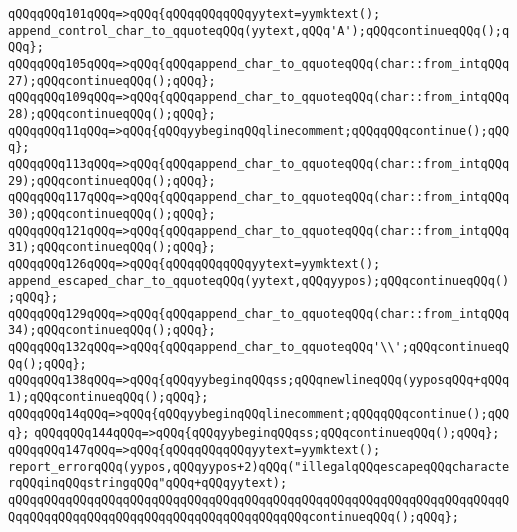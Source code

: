 \newline
\verb|qQQqqQQq101qQQq=>qQQq{qQQqqQQqqQQqyytext=yymktext();|\newline
\verb|append_control_char_to_qquoteqQQq(yytext,qQQq'A');qQQqcontinueqQQq();qQQq};|\newline
\verb|qQQqqQQq105qQQq=>qQQq{qQQqappend_char_to_qquoteqQQq(char::from_intqQQq27);qQQqcontinueqQQq();qQQq};|\newline
\verb|qQQqqQQq109qQQq=>qQQq{qQQqappend_char_to_qquoteqQQq(char::from_intqQQq28);qQQqcontinueqQQq();qQQq};|\newline
\verb|qQQqqQQq11qQQq=>qQQq{qQQqyybeginqQQqlinecomment;qQQqqQQqcontinue();qQQq};|\newline
\verb|qQQqqQQq113qQQq=>qQQq{qQQqappend_char_to_qquoteqQQq(char::from_intqQQq29);qQQqcontinueqQQq();qQQq};|\newline
\verb|qQQqqQQq117qQQq=>qQQq{qQQqappend_char_to_qquoteqQQq(char::from_intqQQq30);qQQqcontinueqQQq();qQQq};|\newline
\verb|qQQqqQQq121qQQq=>qQQq{qQQqappend_char_to_qquoteqQQq(char::from_intqQQq31);qQQqcontinueqQQq();qQQq};|\newline
\verb|qQQqqQQq126qQQq=>qQQq{qQQqqQQqqQQqyytext=yymktext();|\newline
\verb|append_escaped_char_to_qquoteqQQq(yytext,qQQqyypos);qQQqcontinueqQQq();qQQq};|\newline
\verb|qQQqqQQq129qQQq=>qQQq{qQQqappend_char_to_qquoteqQQq(char::from_intqQQq34);qQQqcontinueqQQq();qQQq};|\newline
\verb|qQQqqQQq132qQQq=>qQQq{qQQqappend_char_to_qquoteqQQq'\\';qQQqcontinueqQQq();qQQq};|\newline
\verb|qQQqqQQq138qQQq=>qQQq{qQQqyybeginqQQqss;qQQqnewlineqQQq(yyposqQQq+qQQq1);qQQqcontinueqQQq();qQQq};|\newline
\verb|qQQqqQQq14qQQq=>qQQq{qQQqyybeginqQQqlinecomment;qQQqqQQqcontinue();qQQq};|\newline
\verb|qQQqqQQq144qQQq=>qQQq{qQQqyybeginqQQqss;qQQqcontinueqQQq();qQQq};|\newline
\verb|qQQqqQQq147qQQq=>qQQq{qQQqqQQqqQQqyytext=yymktext();|\newline
\verb|report_errorqQQq(yypos,qQQqyypos+2)qQQq("illegalqQQqescapeqQQqcharacterqQQqinqQQqstringqQQq"qQQq+qQQqyytext);|\newline
\verb|qQQqqQQqqQQqqQQqqQQqqQQqqQQqqQQqqQQqqQQqqQQqqQQqqQQqqQQqqQQqqQQqqQQqqQQqqQQqqQQqqQQqqQQqqQQqqQQqqQQqqQQqqQQqqQQqcontinueqQQq();qQQq};|\newline
